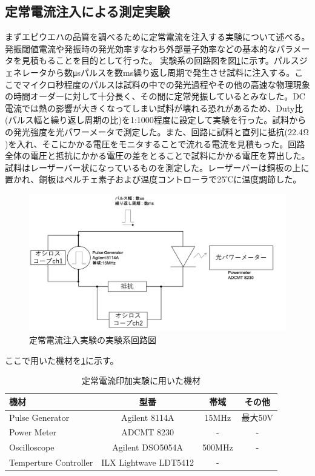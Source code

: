 \subsection{定常電流注入による測定実験}%
まずエピウエハの品質を調べるために定常電流を注入する実験について述べる。発振閾値電流や発振時の発光効率すなわち外部量子効率などの基本的なパラメータを見積もることを目的として行った。
実験系の回路図を図\ref{fig:fig_2_2_IL_setup}に示す。パルスジェネレータから数\si{\micro s}パルスを数ms繰り返し周期で発生させ試料に注入する。ここでマイクロ秒程度のパルスは試料の中での発光過程やその他の高速な物理現象の時間オーダーに対して十分長く、その間に定常発振しているとみなした。DC電流では熱の影響が大きくなってしまい試料が壊れる恐れがあるため、Duty比(パルス幅と繰り返し周期の比)を1:1000程度に設定して実験を行った。試料からの発光強度を光パワーメータで測定した。また、回路に試料と直列に抵抗(22.4$\rm{\Omega}$)を入れ、そこにかかる電圧をモニタすることで流れる電流を見積もった。回路全体の電圧と抵抗にかかる電圧の差をとることで試料にかかる電圧を算出した。
試料はレーザーバー状になっているものを測定した。レーザーバーは銅板の上に置かれ、銅板はペルチェ素子および温度コントローラで25℃に温度調節した。

\begin{figure}[htbp]
	\includegraphics[width=15cm]{figure/fig_2_2_IL_setup.png}
	\caption{定常電流注入実験の実験系回路図}
	\label{fig:fig_2_2_IL_setup}
\end{figure}
\clearpage
ここで用いた機材を\ref{table:table_2_2_IL_setup}に示す。
\begin{table}[h]
  \caption{定常電流印加実験に用いた機材}
    \label{table:table_2_2_IL_setup}
  \centering
  \begin{tabular}{lccc}
    \hline
    機材  & 型番 &帯域  & その他  \\
    \hline \hline
    Pulse Generator  & Agilent 8114A & 15MHz &最大50V \\
    Power Meter  &  ADCMT 8230 & -&-  \\
    Oscilloscope  &  Agilent DSO5054A &500MHz&- \\
    Temperture Controller & ILX Lightwave  LDT5412&-\\
       \hline
  \end{tabular}
\end{table}

